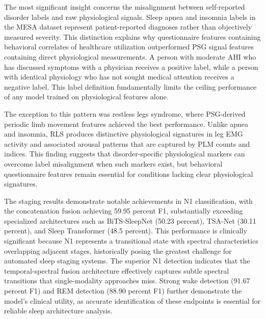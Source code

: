 \documentclass{ieeetj}
\begin{document}
The most significant insight concerns the misalignment between self-reported disorder labels and raw physiological signals. Sleep apnea and insomnia labels in the MESA dataset represent patient-reported diagnoses rather than objectively measured severity. This distinction explains why questionnaire features containing behavioral correlates of healthcare utilization outperformed PSG signal features containing direct physiological measurements. A person with moderate AHI who has discussed symptoms with a physician receives a positive label, while a person with identical physiology who has not sought medical attention receives a negative label. This label definition fundamentally limits the ceiling performance of any model trained on physiological features alone.

The exception to this pattern was restless legs syndrome, where PSG-derived periodic limb movement features achieved the best performance. Unlike apnea and insomnia, RLS produces distinctive physiological signatures in leg EMG activity and associated arousal patterns that are captured by PLM counts and indices. This finding suggests that disorder-specific physiological markers can overcome label misalignment when such markers exist, but behavioral questionnaire features remain essential for conditions lacking clear physiological signatures.

The staging results demonstrate notable achievements in N1 classification, with the concatenation fusion achieving 59.95 percent F1, substantially exceeding specialized architectures such as BiTS-SleepNet (50.23 percent), TSA-Net (30.11 percent), and Sleep Transformer (48.5 percent). This performance is clinically significant because N1 represents a transitional state with spectral characteristics overlapping adjacent stages, historically posing the greatest challenge for automated sleep staging systems. The superior N1 detection indicates that the temporal-spectral fusion architecture effectively captures subtle spectral transitions that single-modality approaches miss. Strong wake detection (91.67 percent F1) and REM detection (88.90 percent F1) further demonstrate the model's clinical utility, as accurate identification of these endpoints is essential for reliable sleep architecture analysis.
\end{document}
